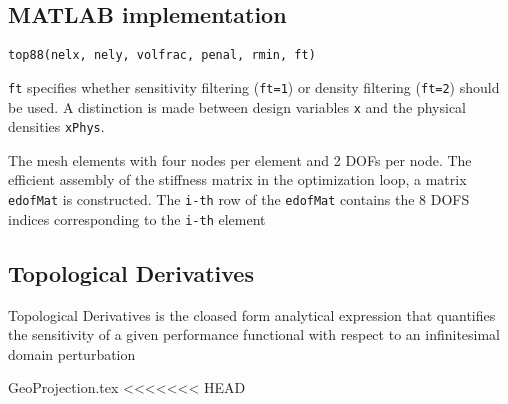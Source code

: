\documentclass{article}
\newcommand{\code}[1]{\colorbox{light-gray}{\texttt{#1}}}
\begin{document}
\subsection*{MATLAB implementation}
\code{top88(nelx, nely, volfrac, penal, rmin, ft)}

\code{ft} specifies whether sensitivity filtering (\code{ft=1}) or density filtering (\code{ft=2}) should be used. A distinction is made between design variables \code {x} and the physical densities \code{xPhys}.

The mesh elements with four nodes per element and 2 DOFs per node. The efficient assembly of the stiffness matrix in the optimization loop, a matrix \code{edofMat} is constructed. The \code{i-th} row of the \code{edofMat} contains the 8 DOFS indices corresponding to the \code{i-th} element
\subsection*{Topological Derivatives}
Topological Derivatives is the cloased form analytical expression that quantifies the sensitivity of a given performance functional with respect to an infinitesimal domain perturbation

{GeoProjection.tex}
<<<<<<< HEAD
\end{document}
